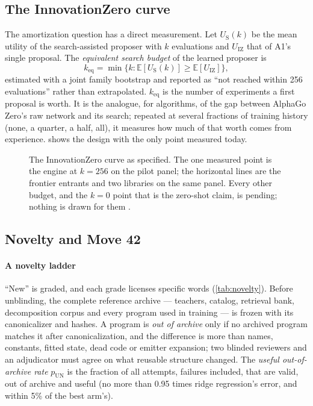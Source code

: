 \subsection{The InnovationZero curve}

The amortization question has a direct measurement. Let $U_{\mathrm{S}}(k)$ be the mean utility of
the search-assisted proposer with $k$ evaluations and $U_{\mathrm{IZ}}$ that of A1's single
proposal. The \emph{equivalent search budget} of the learned proposer is
\begin{equation}
k_{\mathrm{eq}} = \min\bigl\{ k : \mathbb{E}[U_{\mathrm{S}}(k)] \ge \mathbb{E}[U_{\mathrm{IZ}}] \bigr\},
\label{eq:keq}
\end{equation}
estimated with a joint family bootstrap and reported as ``not reached within 256 evaluations'' rather
than extrapolated. $k_{\mathrm{eq}}$ is the number of experiments a first proposal is worth. It is
the analogue, for algorithms, of the gap between AlphaGo Zero's raw network and its search; repeated
at several fractions of training history (none, a quarter, a half, all), it measures how much of
that worth comes from experience.  shows the design with the only point measured
today.

\begin{figure}[t]
\centering

\caption{The InnovationZero curve as specified. The one measured point is the engine at
$k=256$ on the pilot panel; the horizontal lines are the frontier entrants and two libraries on the
same panel. Every other budget, and the $k=0$ point that is the zero-shot claim, is pending; nothing
is drawn for them \pend.}
\label{fig:curve}
\end{figure}

\subsection{Novelty and Move 42}

\paragraph{A novelty ladder} ``New'' is graded, and each grade licenses specific words
(\cref{tab:novelty}). Before unblinding, the complete reference archive --- teachers, catalog,
retrieval bank, decomposition corpus and every program used in training --- is frozen with its
canonicalizer and hashes. A program is \emph{out of archive} only if no archived program matches it
after canonicalization, and the difference is more than names, constants, fitted state, dead code or
emitter expansion; two blinded reviewers and an adjudicator must agree on what reusable structure
changed. The \emph{useful out-of-archive rate} $p_{\mathrm{UN}}$ is the fraction of all attempts,
failures included, that are valid, out of archive and useful (no more than 0.95 times ridge
regression's error, and within 5\% of the best arm's).

